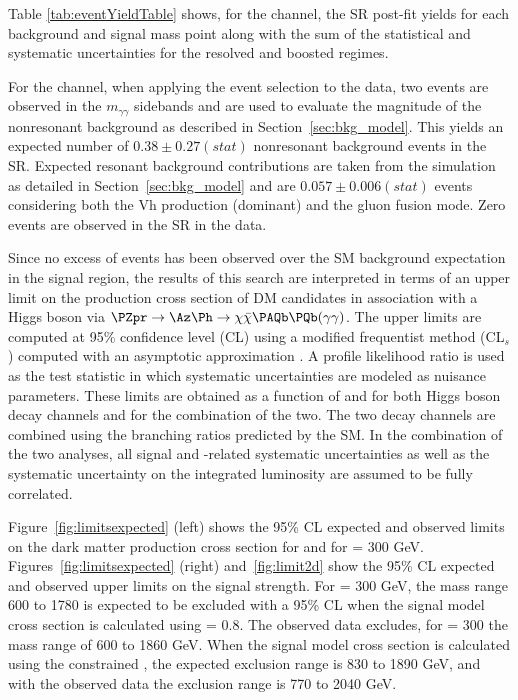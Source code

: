 

Table \ref{tab:eventYieldTable} shows, for the \Hbb channel, the 
SR post-fit yields for each background and signal mass point along with the 
sum of the statistical and systematic uncertainties for the resolved and boosted regimes. 

For the \HGG channel, when applying the event selection to the data, two events are observed in the $m_{\gamma\gamma}$ sidebands and are used to 
evaluate the magnitude of the nonresonant background as described in Section~\ref{sec:bkg_model}. 
This yields an expected number of $0.38 \pm 0.27 (stat)$ nonresonant background events in the SR.
Expected resonant background contributions are taken from the simulation as detailed in Section~\ref{sec:bkg_model} and are $0.057 \pm 0.006 (stat)$ events considering both the Vh production (dominant) and the gluon fusion mode. Zero events are observed in the SR in the data.



Since no excess of events has been observed over the SM background expectation in the signal region, the results of this search are interpreted in terms of an upper limit on the production cross 
section of DM candidates in association with a Higgs boson via $\PZpr \rightarrow \Az \Ph \rightarrow \chi \bar{\chi} \PAQb\PQb(\gamma\gamma)$. 
The upper limits are computed at 95\% confidence level (CL) using a modified frequentist method (CL$_s$) \cite{yellowReport, bib:CLS1, bib:CLS2} computed with an asymptotic approximation \cite{bib:CLS3}. 
A profile likelihood ratio is used as the test statistic in which systematic uncertainties are modeled as nuisance parameters.
These limits are obtained as a function of \mzp and \maz for both Higgs boson decay channels and for the combination of the two. The two decay channels are combined using the branching ratios predicted by the SM.
In the combination of the two analyses, all signal and \MET-related systematic uncertainties as well as the systematic uncertainty on the integrated luminosity 
are assumed to be fully correlated.

Figure~\ref{fig:limitsexpected} (left) shows the 95\% CL expected and observed limits on the dark matter production cross section for 
\Hbb and \HGG for \maz = 300 GeV. 
Figures~\ref{fig:limitsexpected} (right) and~\ref{fig:limit2d} show the 95\% CL  expected and observed upper limits on the signal strength. 
For \maz = 300 GeV, the \mzp mass range 600 to 1780 \GeV is expected to be excluded with a 95\% CL when the signal model 
cross section is calculated using \gzp = 0.8. 
The observed data excludes, for \maz = 300 \GeV the \zp mass range of 600 to 1860 GeV. 
When the signal model cross section is calculated using the constrained \gzp, the expected exclusion range is 830 to 1890 GeV, 
and with the observed data the exclusion range is 770 to 2040 GeV. 
